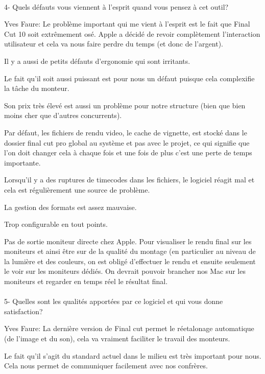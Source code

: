 \paragraph{}
4- Quels défauts vous viennent à l'esprit quand vous pensez à cet outil?

Yves Faure: Le problème important qui me vient à l'esprit est le fait que Final Cut 10 soit
extrêmement osé. Apple a décidé de revoir complètement l'interaction
utilisateur et cela va nous faire perdre du temps (et donc de l'argent).

Il y a aussi de petits défauts d'ergonomie qui sont irritants.

Le fait qu'il soit aussi puissant est pour nous un défaut puisque cela
complexifie la tâche du monteur.

Son prix très élevé est aussi un problème pour notre structure (bien que bien
moins cher que d'autres concurrents).

Par défaut, les fichiers de rendu video, le cache de vignette, est stocké dans
le dossier final cut pro global au  système et pas avec le projet, ce qui
signifie que l'on doit changer cela à chaque fois et une fois de plus c'est une
perte de temps importante.

Lorsqu'il y a des ruptures de timecodes dans les fichiers, le logiciel réagit mal
et cela est régulièrement une source de problème.

La gestion des formats est assez mauvaise.

Trop configurable en tout points.

Pas de sortie moniteur directe chez Apple. Pour visualiser le rendu final sur les
moniteurs et ainsi être sur de la qualité du montage (en particulier au niveau de
la lumière et des couleurs, on est obligé d'effectuer le rendu et ensuite
seulement le voir sur les moniteurs dédiés. On devrait pouvoir brancher nos Mac
sur les moniteurs et regarder en temps réel le résultat final.

\paragraph{}
5- Quelles sont les qualités apportées par ce logiciel et qui vous donne satisfaction?

Yves Faure: La dernière version de Final cut permet le réetalonage automatique (de l'image
et du son), cela va vraiment faciliter le travail des monteurs.

Le fait qu'il s'agit du standard actuel dans le milieu est très important pour
nous. Cela nous permet de communiquer facilement avec nos confrères.

